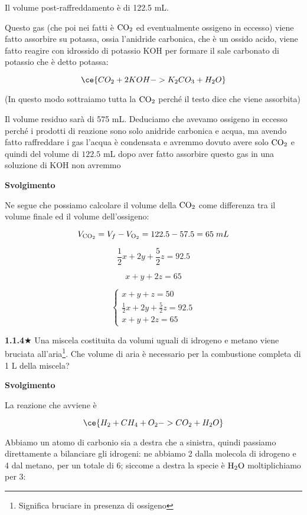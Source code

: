 Il volume post-raffreddamento è di 122.5 mL.

Questo gas (che poi nei fatti è $\rm CO_2$ ed eventualmente ossigeno in eccesso) viene fatto assorbire su potassa, ossia l'anidride carbonica, che è un ossido acido, viene fatto reagire con idrossido di potassio KOH per formare il sale carbonato di potassio che è detto potassa:

$$\ce{CO_2 + 2KOH -> K_2CO_3 + H_2O}$$

(In questo modo sottraiamo tutta la $\rm CO_2$ perché il testo dice che viene assorbita)

Il volume residuo sarà di 575 mL. Deduciamo che avevamo ossigeno in eccesso perché i prodotti di reazione sono solo anidride carbonica e acqua, ma avendo fatto raffreddare i gas l'acqua è condensata e avremmo dovuto avere solo $\rm CO_2$ e quindi del volume di $122.5$ mL dopo aver fatto assorbire questo gas in una soluzione di KOH non avremmo

\vspace{0.2cm}\large\textbf{Svolgimento}\normalsize

\vspace{0.2cm}Ne segue che possiamo calcolare il volume della $\rm CO_2$ come differenza tra il volume finale ed il volume dell'ossigeno:

$$V_{\rm CO_2}= V_f - V_{\rm O_2}=122.5 - 57.5 = 65\;mL$$

$$\frac{1}{2}x + 2y + \frac{5}{2}z=92.5$$

$$x+y+2z=65$$

$$\begin{cases}
    x+y+z=50\\
    \frac{1}{2}x + 2y + \frac{5}{2}z=92.5\\
    x+y+2z=65
\end{cases}$$

\vspace{0.2cm}\textbf{1.1.4}$\bigstar$ Una miscela costituita da volumi uguali di idrogeno e metano viene bruciata all'aria\footnote{Significa bruciare in presenza di ossigeno}. Che volume di aria è necessario per la combustione completa di 1 L della miscela?

\vspace{0.2cm}\large\textbf{Svolgimento}\normalsize

\vspace{0.2cm}La reazione che avviene è

$$\ce{H_2 + CH_4 + O_2 -> CO_2 + H_2O}$$

Abbiamo un atomo di carbonio sia a destra che a sinistra, quindi passiamo direttamente a bilanciare gli idrogeni: ne abbiamo 2 dalla molecola di idrogeno e 4 dal metano, per un totale di 6; siccome a destra la specie è $\rm H_2O$ moltiplichiamo per 3:

